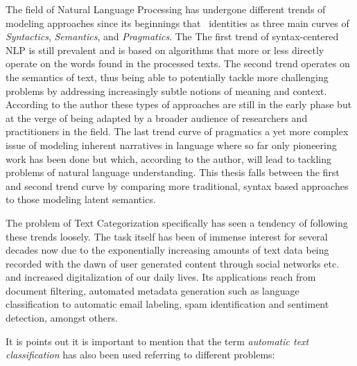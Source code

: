 The field of Natural Language Processing has undergone different trends of modeling approaches since its beginnings that~\cite{Cambria:2014aa} identities as three main curves of \emph{Syntactics}, \emph{Semantics}, and \emph{Pragmatics}. The The first trend of syntax-centered NLP is still prevalent and is based on algorithms that more or less directly operate on the words found in the processed texts.
The second trend operates on the semantics of text, thus being able to potentially tackle more challenging problems by addressing increasingly subtle notions of meaning and context. According to the author these types of approaches are still in the early phase but at the verge of being adapted by a broader audience of researchers and practitioners in the field. The last trend curve of pragmatics a yet more complex issue of modeling inherent narratives in language where so far only pioneering work has been done but which, according to the author, will lead to tackling problems of natural language understanding. This thesis falls between the first and second trend curve by comparing more traditional, syntax based approaches to those modeling latent semantics.

The problem of Text Categorization specifically has seen a tendency of following these trends loosely. The task itself has been of immense interest for several decades now due to the exponentially increasing amounts of text data being recorded with the dawn of user generated content through social networks etc. and increased digitalization of our daily lives. Its applications reach from document filtering, automated metadata generation such as language classification to automatic email labeling, spam identification and sentiment detection, amongst others.

It is \cite{Sebastiani:2002aa} points out it is important to mention that the term \emph{automatic text classification} has also been used referring to different problems: ~\cite{Sebastiani:2002aa}

